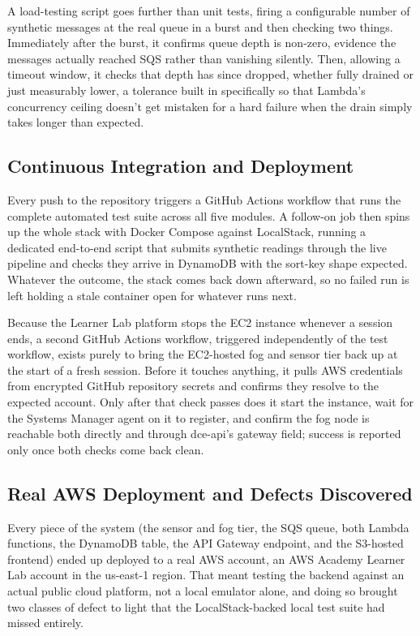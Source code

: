 \documentclass[conference]{IEEEtran}
\begin{document}
A load-testing script goes further than unit tests, firing a configurable number of synthetic messages at the real queue in a burst and then checking two things. Immediately after the burst, it confirms queue depth is non-zero, evidence the messages actually reached SQS rather than vanishing silently. Then, allowing a timeout window, it checks that depth has since dropped, whether fully drained or just measurably lower, a tolerance built in specifically so that Lambda's concurrency ceiling doesn't get mistaken for a hard failure when the drain simply takes longer than expected.

\subsection{Continuous Integration and Deployment}
Every push to the repository triggers a GitHub Actions workflow that runs the complete automated test suite across all five modules. A follow-on job then spins up the whole stack with Docker Compose against LocalStack, running a dedicated end-to-end script that submits synthetic readings through the live pipeline and checks they arrive in DynamoDB with the sort-key shape expected. Whatever the outcome, the stack comes back down afterward, so no failed run is left holding a stale container open for whatever runs next.

Because the Learner Lab platform stops the EC2 instance whenever a session ends, a second GitHub Actions workflow, triggered independently of the test workflow, exists purely to bring the EC2-hosted fog and sensor tier back up at the start of a fresh session. Before it touches anything, it pulls AWS credentials from encrypted GitHub repository secrets and confirms they resolve to the expected account. Only after that check passes does it start the instance, wait for the Systems Manager agent on it to register, and confirm the fog node is reachable both directly and through dce-api's gateway field; success is reported only once both checks come back clean.

\subsection{Real AWS Deployment and Defects Discovered}
Every piece of the system (the sensor and fog tier, the SQS queue, both Lambda functions, the DynamoDB table, the API Gateway endpoint, and the S3-hosted frontend) ended up deployed to a real AWS account, an AWS Academy Learner Lab account in the us-east-1 region. That meant testing the backend against an actual public cloud platform, not a local emulator alone, and doing so brought two classes of defect to light that the LocalStack-backed local test suite had missed entirely.
\end{document}
